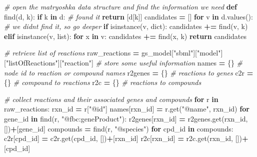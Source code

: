 \documentclass[
]{book}
\newenvironment{Shaded}{\begin{snugshade}}{\end{snugshade}}
\newcommand{\BuiltInTok}[1]{#1}
\newcommand{\CommentTok}[1]{\textcolor[rgb]{0.56,0.35,0.01}{\textit{#1}}}
\newcommand{\ControlFlowTok}[1]{\textcolor[rgb]{0.13,0.29,0.53}{\textbf{#1}}}
\newcommand{\KeywordTok}[1]{\textcolor[rgb]{0.13,0.29,0.53}{\textbf{#1}}}
\newcommand{\NormalTok}[1]{#1}
\newcommand{\OperatorTok}[1]{\textcolor[rgb]{0.81,0.36,0.00}{\textbf{#1}}}
\newcommand{\StringTok}[1]{\textcolor[rgb]{0.31,0.60,0.02}{#1}}
\begin{document}
\begin{Shaded}
\begin{Highlighting}[numbers=left,,]
\CommentTok{\# open the matryoshka data structure and find the information we need}
\KeywordTok{def}\NormalTok{ find(d, k):}
    \ControlFlowTok{if}\NormalTok{ k }\KeywordTok{in}\NormalTok{ d:  }\CommentTok{\# found it}
        \ControlFlowTok{return}\NormalTok{ [d[k]]}
\NormalTok{    candidates }\OperatorTok{=}\NormalTok{ []}
    \ControlFlowTok{for}\NormalTok{ v }\KeywordTok{in}\NormalTok{ d.values(): }\CommentTok{\# we didn\textquotesingle{}t find it, so go deeper}
        \ControlFlowTok{if} \BuiltInTok{isinstance}\NormalTok{(v, }\BuiltInTok{dict}\NormalTok{):}
\NormalTok{            candidates }\OperatorTok{+=}\NormalTok{ find(v, k)}
        \ControlFlowTok{elif} \BuiltInTok{isinstance}\NormalTok{(v, }\BuiltInTok{list}\NormalTok{):}
            \ControlFlowTok{for}\NormalTok{ x }\KeywordTok{in}\NormalTok{ v:}
\NormalTok{                candidates }\OperatorTok{+=}\NormalTok{ find(x, k)}
    \ControlFlowTok{return}\NormalTok{ candidates}

\CommentTok{\# retrieve list of reactions}
\NormalTok{raw\_reactions }\OperatorTok{=}\NormalTok{ gs\_model[}\StringTok{"sbml"}\NormalTok{][}\StringTok{"model"}\NormalTok{][}\StringTok{"listOfReactions"}\NormalTok{][}\StringTok{"reaction"}\NormalTok{]}
\CommentTok{\# store some useful information}
\NormalTok{names }\OperatorTok{=}\NormalTok{ \{\}      }\CommentTok{\# node id to reaction or compound names}
\NormalTok{r2genes }\OperatorTok{=}\NormalTok{ \{\}    }\CommentTok{\# reactions to genes}
\NormalTok{c2r }\OperatorTok{=}\NormalTok{ \{\}        }\CommentTok{\# compound to reactions}
\NormalTok{r2c }\OperatorTok{=}\NormalTok{ \{\}        }\CommentTok{\# reactions to compounds}

\CommentTok{\# collect reactions and their associated genes and compounds}
\ControlFlowTok{for}\NormalTok{ r }\KeywordTok{in}\NormalTok{ raw\_reactions:}
\NormalTok{    rxn\_id }\OperatorTok{=}\NormalTok{ r[}\StringTok{"@id"}\NormalTok{]}
\NormalTok{    names[rxn\_id] }\OperatorTok{=}\NormalTok{ r.get(}\StringTok{"@name"}\NormalTok{, rxn\_id)}
    \ControlFlowTok{for}\NormalTok{ gene\_id }\KeywordTok{in}\NormalTok{ find(r, }\StringTok{"@fbc:geneProduct"}\NormalTok{):}
\NormalTok{        r2genes[rxn\_id] }\OperatorTok{=}\NormalTok{ r2genes.get(rxn\_id, [])}\OperatorTok{+}\NormalTok{[gene\_id]}
\NormalTok{    compounds }\OperatorTok{=}\NormalTok{ find(r, }\StringTok{"@species"}\NormalTok{)}
    \ControlFlowTok{for}\NormalTok{ cpd\_id }\KeywordTok{in}\NormalTok{ compounds:}
\NormalTok{        c2r[cpd\_id] }\OperatorTok{=}\NormalTok{ c2r.get(cpd\_id, [])}\OperatorTok{+}\NormalTok{[rxn\_id]}
\NormalTok{        r2c[rxn\_id] }\OperatorTok{=}\NormalTok{ r2c.get(rxn\_id, [])}\OperatorTok{+}\NormalTok{[cpd\_id]}


\end{Highlighting}
\end{Shaded}
\end{document}
